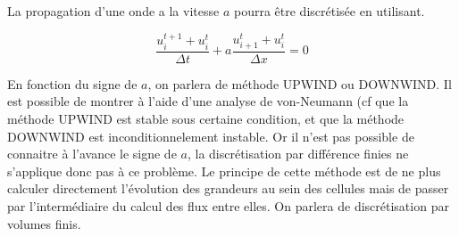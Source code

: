La propagation d'une onde a la vitesse $a$ pourra être discrétisée en utilisant.

\begin{equation}
\frac{u_i^{t+1} + u_i^t }{\Delta t}   +a \frac{u_{i+1}^t  + u_i^t}{\Delta x} = 0
\end{equation}

En fonction du signe de $a$, on parlera de méthode UPWIND ou DOWNWIND.
Il est possible de montrer à l'aide d'une analyse de von-Neumann (cf \cite{toro1999riemann} que la méthode UPWIND est stable sous certaine condition, et que la méthode DOWNWIND est inconditionnelement instable.
Or il n'est pas possible de connaitre à l'avance le signe de $a$, la discrétisation par différence finies ne s'applique donc pas à ce problème. 
Le principe de cette méthode est de ne plus calculer directement l'évolution des grandeurs au sein des cellules mais de passer par l'intermédiaire du calcul des flux entre elles.
On parlera de discrétisation par volumes finis.



